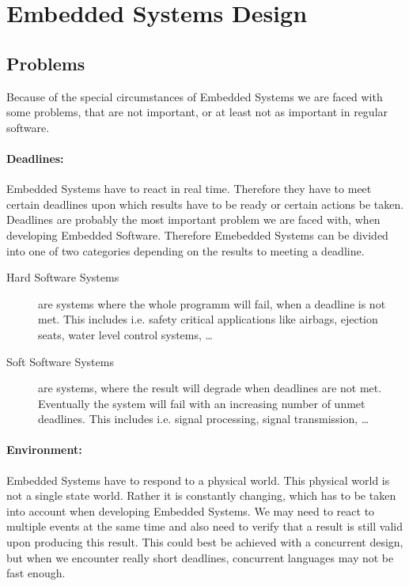 \documentclass[10pt,a4paper,titlepage,draft]{report} %
\begin{document}

\section{Embedded Systems Design}
\subsection{Problems}
Because of the special circumstances of Embedded Systems we are faced with some problems, that are not important, or at least not as important in regular software.

\paragraph{Deadlines:}
Embedded Systems have to react in real time.
Therefore they have to meet certain deadlines upon which results have to be ready or certain actions be taken.
Deadlines are probably the most important problem we are faced with, when developing Embedded Software.
Therefore Emebedded Systems can be divided into one of two categories depending on the results to meeting a deadline.

\begin{description}
	\item[Hard Software Systems] are systems where the whole programm will fail, when a deadline is not met.
	This includes i.e. safety critical applications like airbags, ejection seats, water level control systems, \dots
	\item[Soft Software Systems] are systems, where the result will degrade when deadlines are not met.
	Eventually the system will fail with an increasing number of unmet deadlines. This includes i.e. signal processing, signal transmission, \dots
\end{description}

\paragraph{Environment:}
Embedded Systems have to respond to a physical world. This physical world is not a single state world.
Rather it is constantly changing, which has to be taken into account when developing Embedded Systems.
We may need to react to multiple events at the same time and also need to verify that a result is still valid upon producing this result.
This could best be achieved with a concurrent design, but when we encounter really short deadlines, concurrent languages may not be fast enough.
\end{document}
